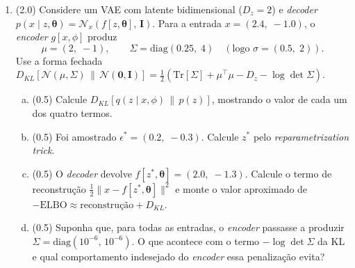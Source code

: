 \documentclass[11pt,a4paper]{article}
\newcommand{\thetav}{\boldsymbol{\theta}}
\begin{document}
\begin{enumerate}[1)]
\begin{enumerate}[a)]
    \item ( )\,V \quad ( )\,F \quad No modelo difusor, o \textit{encoder} que adiciona ruído possui parâmetros treináveis ajustados em conjunto com o \textit{decoder}, de forma análoga ao \textit{encoder} de um VAE.\\[0.2em]
    \rule{\linewidth}{0.4pt}\\[0.2em]
    \rule{\linewidth}{0.4pt}

    \item ( )\,V \quad ( )\,F \quad No trilema dos modelos geradores, os modelos difusores ocupam o canto \emph{qualidade $+$ cobertura}, pagando com amostragem lenta (tipicamente $T \approx 1000$ passos pela U-Net).\\[0.2em]
    \rule{\linewidth}{0.4pt}\\[0.2em]
    \rule{\linewidth}{0.4pt}
\end{enumerate}

\item (2.0) Considere um VAE com latente bidimensional ($D_z = 2$) e \textit{decoder} $p(x \mid z, \thetav) = \mathcal{N}_{x}\!\left(f[z,\thetav],\, \mathbf{I}\right)$. Para a entrada $x = (2.4,\; -1.0)$, o \textit{encoder} $g[x,\phi]$ produz
\[
  \mu = (2,\; -1), \qquad \Sigma = \mathrm{diag}(0.25,\; 4) \quad (\text{logo } \sigma = (0.5,\; 2)).
\]
Use a forma fechada $D_{KL}\!\left[\mathcal{N}(\mu,\Sigma)\,\|\,\mathcal{N}(\mathbf{0},\mathbf{I})\right] = \tfrac{1}{2}\!\left(\mathrm{Tr}[\Sigma] + \mu^{\top}\mu - D_z - \log\det\Sigma\right)$.

\begin{enumerate}[a)]
    \item (0.5) Calcule $D_{KL}\!\left[q(z \mid x, \phi)\,\|\,p(z)\right]$, mostrando o valor de cada um dos quatro termos.
    \vspace{2.5cm}

    \item (0.5) Foi amostrado $\epsilon^{*} = (0.2,\; -0.3)$. Calcule $z^{*}$ pelo \textit{reparametrization trick}.
    \vspace{2cm}

    \item (0.5) O \textit{decoder} devolve $f[z^{*},\thetav] = (2.0,\; -1.3)$. Calcule o termo de reconstrução $\tfrac{1}{2}\lVert x - f[z^{*},\thetav]\rVert^{2}$ e monte o valor aproximado de $-\mathrm{ELBO} \approx \text{reconstrução} + D_{KL}$.
    \vspace{2.5cm}

    \item (0.5) Suponha que, para todas as entradas, o \textit{encoder} passasse a produzir $\Sigma = \mathrm{diag}(10^{-6},\, 10^{-6})$. O que acontece com o termo $-\log\det\Sigma$ da KL e qual comportamento indesejado do \textit{encoder} essa penalização evita?
    \vspace{2.5cm}
\end{enumerate}

\end{enumerate}
\end{document}
